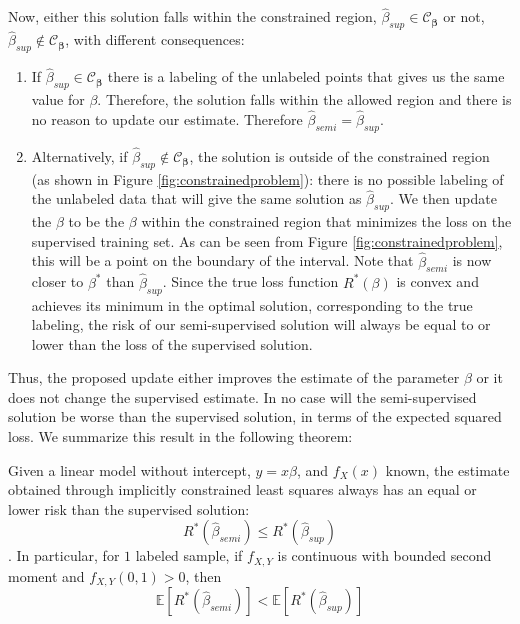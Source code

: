 \documentclass{llncs}
\begin{document}
Now, either this solution falls within the constrained region, $\hat{\beta}_{sup} \in \mathcal{C}_{\boldsymbol{\beta}}$ or not, $\hat{\beta}_{sup} \notin \mathcal{C}_{\boldsymbol{\beta}}$, with different consequences:

\begin{enumerate}
  \item If $\hat{\beta}_{sup} \in \mathcal{C}_{\boldsymbol{\beta}}$ there is a labeling of the unlabeled points that gives us the same value for $\beta$. Therefore, the solution falls within the allowed region and there is no reason to update our estimate. Therefore $\hat{\beta}_{semi}=\hat{\beta}_{sup}$.
  \item Alternatively, if $\hat{\beta}_{sup} \notin  \mathcal{C}_{\boldsymbol{\beta}}$, the solution is outside of the constrained region (as shown in Figure \ref{fig:constrainedproblem}): there is no possible labeling of the unlabeled data that will give the same solution as $\hat{\beta}_{sup}$. We then update the $\beta$ to be the $\beta$ within the constrained region that minimizes the loss on the supervised training set. As can be seen from Figure \ref{fig:constrainedproblem}, this will be a point on the boundary of the interval. Note that $\hat{\beta}_{semi}$ is now closer to $\beta^{*}$ than $\hat{\beta}_{sup}$. Since the true loss function $R^*(\beta)$ is convex  and achieves its minimum in the optimal solution, corresponding to the true labeling, the risk of our semi-supervised solution will always be equal to or lower than the loss of the supervised solution.
\end{enumerate}

Thus, the proposed update either improves the estimate of the parameter $\beta$ or it does not change the supervised estimate. In no case will the semi-supervised solution be worse than the supervised solution, in terms of the expected squared loss. We summarize this result in the following theorem:

\begin{theorem} \mbox{}
Given a linear model without intercept, $y = x\beta$, and $f_X(x)$ known, the estimate obtained through implicitly constrained least squares always has an equal or lower risk than the supervised solution: $$R^\ast (\hat{\beta}_{semi}) \le R^\ast (\hat{\beta}_{sup})$$.
In particular, for $1$ labeled sample, if $f_{X,Y}$ is continuous with bounded second moment and $f_{X,Y}(0,1) > 0$, then $$\mathbb{E}[R^*(\hat{\beta}_{semi})] < \mathbb{E}[R^*(\hat{\beta}_{sup})]$$
\end{theorem}
\end{document}
